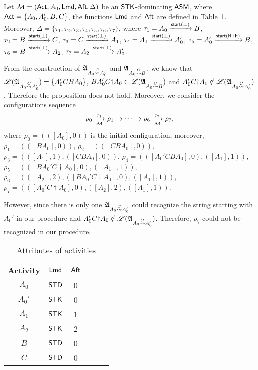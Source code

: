 \begin{example}
    Let ${\mathcal{M} } = ({\sf Act}, A_0, {\sf Lmd}, {\sf Aft}, \Delta)$ be an $\mathsf{STK}$-dominating $\textsf{ASM}$,
where ${\sf Act} = \{A_0, A_0', B, C\}$, the functions ${\sf Lmd}$ and ${\sf Aft}$ are defined in Table~\ref{tab-attribute-nostk}. Moreover, $\Delta = \{\tau_1,\tau_2,\tau_3,\tau_4,\tau_5,\tau_6,\tau_7\}$, where $\tau_1 = A_0\xrightarrow{{\mathsf{start} }(\bot)}B$, $\tau_2 = B\xrightarrow{{\mathsf{start} }(\bot)}C$, $\tau_3 = C\xrightarrow{{\mathsf{start} }(\bot)}A_1$, $\tau_4 = A_1\xrightarrow{{\mathsf{start} }(\bot)}A_0'$, $\tau_5 = A_0'\xrightarrow{{\mathsf{start} }({\sf RTF})}B$, $\tau_6 = B\xrightarrow{{\mathsf{start} }(\bot)}A_2$, $\tau_7 = A_2\xrightarrow{{\mathsf{start} }(\bot)}A_0'$. 

From the construction of ${\mathfrak{A} }_{A_0\stackrel{C}\rightsquigarrow A_0'}$ and ${\mathfrak{A} }_{A_0\stackrel{C}\rightsquigarrow B}$, we know that ${\mathscr{L} }({\mathfrak{A} }_{A_0\stackrel{C}\rightsquigarrow A_0'}) = \{A_0'CBA_0\}$, $B A_0'C\dag A_0 \in {\mathscr{L} }({\mathfrak{A} }_{A_0\stackrel{C}\rightsquigarrow B})$ and $A_0'C\dag A_0 \notin {\mathscr{L} }({\mathfrak{A} }_{A_0\stackrel{C}\rightsquigarrow A_0'})$. Therefore the proposition does not hold.
Moreover, we consider the configurations sequence 
$$\rho_0 \xrightarrow[{\mathcal{M} }]{\tau_1}\rho_1\rightarrow\cdots\rightarrow\rho_6\xrightarrow[{\mathcal{M} }]{\tau_7}\rho_7,$$
where $\rho_0 = (([A_0],0))$ is the initial configuration, moreover, $\rho_1 = (([BA_0],0))$, $\rho_2 = (([CBA_0],0))$, $\rho_3 = (([A_1],1),([CBA_0],0))$, $\rho_4 = (([A_0'CB A_0],0),([A_1],1))$, $\rho_5 = (([BA_0'C\dag A_0],0),([A_1],1))$, $\rho_6 = (([A_2],2),([BA_0'C\dag A_0],0),([A_1],1))$, $\rho_7 = (([A_0'C\dag A_0],0),([A_2],2), ([A_1],1))$.

However, since there is only one {\WOTrNFA} ${\mathfrak{A} }_{A_0\stackrel{C}\rightsquigarrow A_0'}$ could recognize the string starting with $A_0'$ in our procedure and $A_0'C\dag A_0 \notin {\mathscr{L} }({\mathfrak{A} }_{A_0\stackrel{C}\rightsquigarrow A_0'})$. Therefore, $\rho_7$ could not be recognized in our procedure.
\begin{table}[htbp]
	\begin{center}
	\begin{tabular}{|c|c|c|c|c|c|}
	\hline
	Activity & ${\sf Lmd}$ & ${\sf Aft}$\\
	\hline
	$A_0$ & $\mathsf{STD}$ & 0\\
	\hline
	$A_0'$ & $\mathsf{STK}$ & 0 \\
	\hline
	$A_1$ & $\mathsf{STK}$ & 1 \\
	\hline
	$A_2$ & $\mathsf{STK}$ & 2 \\
	\hline
	$B$ & $\mathsf{STD}$ & 0 \\
	\hline
	$C$ & $\mathsf{STD}$ & 0 \\
	\hline
	\end{tabular}
	\caption{Attributes of activities}
	\label{tab-attribute-nostk}
	\end{center}
\end{table}
    
\end{example}

